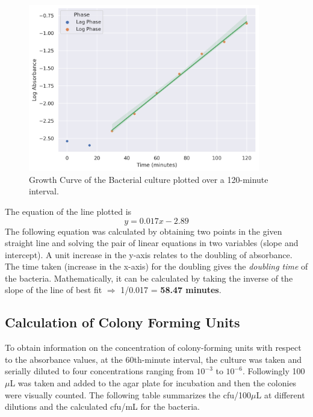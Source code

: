 \documentclass[pdflatex,sn-mathphys]{sn-jnl}%
\theoremstyle{thmstyleone}%
\theoremstyle{thmstyletwo}%
\theoremstyle{thmstylethree}%
\begin{document}
\begin{figure}[h]
  \centering
  \includegraphics[width=0.9\textwidth]{photos/growth_curve.png}
  \caption{Growth Curve of the Bacterial culture plotted over a 120-minute interval. }\label{fig:growth_curve}
\end{figure}
The equation of the line plotted is \[y = 0.017x - 2.89\]
The following equation was calculated by obtaining two points in the given
straight line and solving the pair of linear equations in two variables (slope
and intercept). A unit increase in the y-axis relates to the doubling of
absorbance. The time taken (increase in the x-axis) for the doubling gives the
\textit{doubling time} of the bacteria. Mathematically, it can be calculated by
taking the inverse of the slope of the line of best fit $\Rightarrow$ 1/0.017 =
\textbf{58.47 minutes}.

\subsection{Calculation of Colony Forming Units}
To obtain information on the concentration of colony-forming units with respect
to the absorbance values, at the 60th-minute interval, the culture was taken
and serially diluted to four concentrations ranging from $10^{-3}$ to
$10^{-6}$. Followingly 100$\mu$L was taken and added to the agar plate for
incubation and then the colonies were visually counted. The following table
summarizes the cfu/100$\mu$L at different dilutions and the calculated cfu/mL
for the bacteria.
\end{document}
